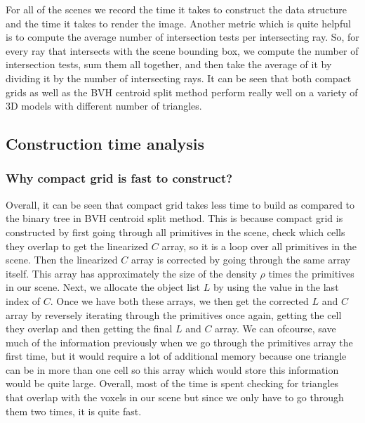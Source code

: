 \documentclass[11pt,a4paper]{article}
\begin{document}
For all of the scenes we record the time it takes to construct the data structure and the time it takes to render the image. Another metric which is quite helpful is to compute the average number of intersection tests per intersecting ray. So, for every ray that intersects with the scene bounding box, we compute the number of intersection tests, sum them all together, and then take the average of it by dividing it by the number of intersecting rays. It can be seen that both compact grids as well as the BVH centroid split method perform really well on a variety of 3D models with different number of triangles. 

\subsection{Construction time analysis}
\subsubsection{Why compact grid is fast to construct?}
Overall, it can be seen that compact grid takes less time to build as compared to the binary tree in BVH centroid split method. This is because compact grid is constructed by first going through all primitives in the scene, check which cells they overlap to get the linearized $C$ array, so it is a loop over all primitives in the scene. Then the linearized $C$ array is corrected by going through the same array itself. This array has approximately the size of the density $\rho$ times the primitives in our scene. Next, we allocate the object list $L$ by using the value in the last index of $C$. Once we have both these arrays, we then get the corrected $L$ and $C$ array by reversely iterating through the primitives once again, getting the cell they overlap and then getting the final $L$ and $C$ array. We can ofcourse, save much of the information previously when we go through the primitives array the first time, but it would require a lot of additional memory because one triangle can be in more than one cell so this array which would store this information would be quite large. Overall, most of the time is spent checking for triangles that overlap with the voxels in our scene but since we only have to go through them two times, it is quite fast.
\end{document}
